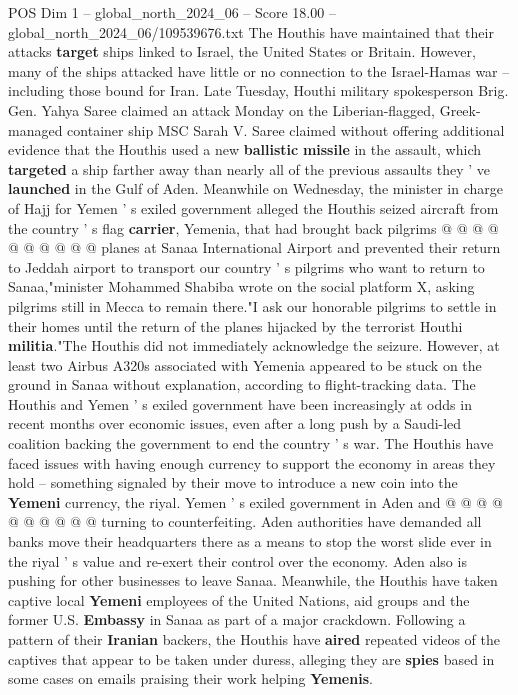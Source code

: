 \begin{textsample}{POS Dim 1 – global\_north\_2024\_06 – Score 18.00 – global\_north\_2024\_06/109539676.txt}
The Houthis have maintained that their attacks \textbf{target} ships linked to Israel, the United States or Britain.
However, many of the ships attacked have little or no connection to the Israel-Hamas war -- including those bound for Iran.
Late Tuesday, Houthi military spokesperson Brig.
Gen.
Yahya Saree claimed an attack Monday on the Liberian-flagged, Greek-managed container ship MSC Sarah V.
Saree claimed without offering additional evidence that the Houthis used a new \textbf{ballistic} \textbf{missile} in the assault, which \textbf{targeted} a ship farther away than nearly all of the previous assaults they ' ve \textbf{launched} in the Gulf of Aden.
Meanwhile on Wednesday, the minister in charge of Hajj for Yemen ' s exiled government alleged the Houthis seized aircraft from the country ' s flag \textbf{carrier}, Yemenia, that had brought back pilgrims @ @ @ @ @ @ @ @ @ @ planes at Sanaa International Airport and prevented their return to Jeddah airport to transport our country ' s pilgrims who want to return to Sanaa,"minister Mohammed Shabiba wrote on the social platform X, asking pilgrims still in Mecca to remain there."I ask our honorable pilgrims to settle in their homes until the return of the planes hijacked by the terrorist Houthi \textbf{militia}."The Houthis did not immediately acknowledge the seizure.
However, at least two Airbus A320s associated with Yemenia appeared to be stuck on the ground in Sanaa without explanation, according to flight-tracking data.
The Houthis and Yemen ' s exiled government have been increasingly at odds in recent months over economic issues, even after a long push by a Saudi-led coalition backing the government to end the country ' s war.
The Houthis have faced issues with having enough currency to support the economy in areas they hold -- something signaled by their move to introduce a new coin into the \textbf{Yemeni} currency, the riyal.
Yemen ' s exiled government in Aden and @ @ @ @ @ @ @ @ @ @ turning to counterfeiting.
Aden authorities have demanded all banks move their headquarters there as a means to stop the worst slide ever in the riyal ' s value and re-exert their control over the economy.
Aden also is pushing for other businesses to leave Sanaa.
Meanwhile, the Houthis have taken captive local \textbf{Yemeni} employees of the United Nations, aid groups and the former U.S. \textbf{Embassy} in Sanaa as part of a major crackdown.
Following a pattern of their \textbf{Iranian} backers, the Houthis have \textbf{aired} repeated videos of the captives that appear to be taken under duress, alleging they are \textbf{spies} based in some cases on emails praising their work helping \textbf{Yemenis}.

\end{textsample}
